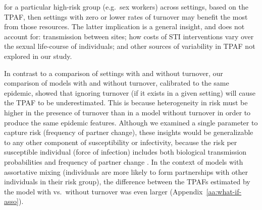 for a particular high-risk group (e.g.\ sex workers) across settings,
based on the TPAF, then settings with zero or lower rates of turnover
may benefit the most from those resources.
The latter implication is a general insight, and does not account for:
transmission between sites;
how costs of STI interventions vary over the sexual life-course of individuals;
and other sources of variability in TPAF not explored in our study.
\par
In contrast to a comparison of settings with and without turnover,
our comparison of models with and without turnover, calibrated to the same epidemic,
showed that ignoring turnover (if it exists in a given setting)
will cause the TPAF to be underestimated.
This is because heterogeneity in risk
must be higher in the presence of turnover than in a model without turnover
in order to produce the same epidemic features.
Although we examined a single parameter to capture risk (frequency of partner change),
these insights would be generalizable to
any other component of susceptibility or infectivity,
because the risk per susceptible individual (force of infection) includes both
biological transmission probabilities and frequency of partner change \citep{Anderson1991}.
In the context of models with assortative mixing
(individuals are more likely to form partnerships with
other individuals in their risk group),
the difference between the TPAFs estimated by the model
with vs.\ without turnover was even larger (Appendix~\ref{aa:what-if-asso}).
